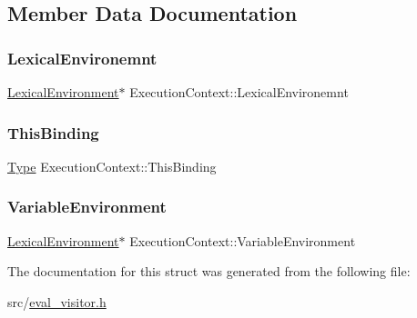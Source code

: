 \subsection{Member Data Documentation}
\mbox{\label{struct_execution_context_a4bfa79ff6d0da2ad14d276f8d03ad0c5}} 
\subsubsection{\texorpdfstring{Lexical\+Environemnt}{LexicalEnvironemnt}}
{\footnotesize\ttfamily \hyperlink{struct_lexical_environment}{Lexical\+Environment}$\ast$ Execution\+Context\+::\+Lexical\+Environemnt}

\mbox{\label{struct_execution_context_a748216918b628fd74beb4f9ec11ca8e8}} 
\subsubsection{\texorpdfstring{This\+Binding}{ThisBinding}}
{\footnotesize\ttfamily \hyperlink{class_type}{Type} Execution\+Context\+::\+This\+Binding}

\mbox{\label{struct_execution_context_a20e7f3f3eed2842a3208faeb1b8ea6f5}} 
\subsubsection{\texorpdfstring{Variable\+Environment}{VariableEnvironment}}
{\footnotesize\ttfamily \hyperlink{struct_lexical_environment}{Lexical\+Environment}$\ast$ Execution\+Context\+::\+Variable\+Environment}



The documentation for this struct was generated from the following file\+:\begin{DoxyCompactItemize}
\item 
src/\hyperlink{eval__visitor_8h}{eval\+\_\+visitor.\+h}\end{DoxyCompactItemize}
